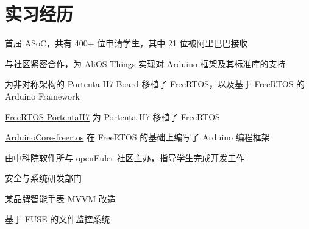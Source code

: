\documentclass[]{deedy-resume-openfont}
\begin{document}
\begin{minipage}[t]{0.73\textwidth} 


\section{实习经历}
\vspace{\topsep}
\begin{tightemize}
    \item 首届 ASoC，共有 400+ 位申请学生，其中 21 位被阿里巴巴接收
    \item 与社区紧密合作，为 AliOS-Things 实现对 Arduino 框架及其标准库的支持
\end{tightemize}
\sectionsep

\begin{tightemize}
\item 为非对称架构的 Portenta H7 Board 移植了 FreeRTOS，以及基于 FreeRTOS 的 Arduino Framework
\item \href{https://github.com/MRNIU/FreeRTOS-PortentaH7}{FreeRTOS-PortentaH7} 为 Portenta H7 移植了 FreeRTOS
\item \href{https://github.com/MRNIU/ArduinoCore-freertos}{ArduinoCore-freertos} 在 FreeRTOS 的基础上编写了 Arduino 编程框架
\end{tightemize}
\sectionsep

\begin{tightemize}
\item 由中科院软件所与 openEuler 社区主办，指导学生完成开发工作
\end{tightemize}
\sectionsep

\begin{tightemize}
\item 安全与系统研发部门
\item 某品牌智能手表 MVVM 改造
\item 基于 FUSE 的文件监控系统
\end{tightemize}
\sectionsep



\end{minipage}
\end{document}
